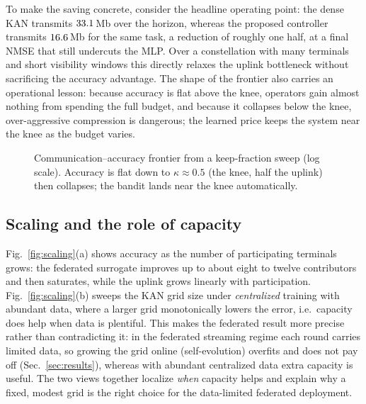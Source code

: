 \documentclass[journal]{IEEEtran}
\begin{document}
To make the saving concrete, consider the headline operating point: the dense KAN
transmits $33.1$\,Mb over the horizon, whereas the proposed controller transmits
$16.6$\,Mb for the same task, a reduction of roughly one half, at a final NMSE
that still undercuts the MLP. Over a constellation with many terminals and short
visibility windows this directly relaxes the uplink bottleneck without sacrificing
the accuracy advantage. The shape of the frontier also carries an operational
lesson: because accuracy is flat above the knee, operators gain almost nothing from
spending the full budget, and because it collapses below the knee, over-aggressive
compression is dangerous; the learned price keeps the system near the knee as the
budget varies.

\begin{figure}[t]
\centering
{}
\caption{Communication--accuracy frontier from a keep-fraction sweep (log scale).
Accuracy is flat down to $\kappa\!\approx\!0.5$ (the knee, half the uplink) then
collapses; the bandit lands near the knee automatically.}
\label{fig:pareto2}
\end{figure}

\subsection{Scaling and the role of capacity}
Fig.~\ref{fig:scaling}(a) shows accuracy as the number of participating terminals
grows: the federated surrogate improves up to about eight to twelve contributors
and then saturates, while the uplink grows linearly with participation.
Fig.~\ref{fig:scaling}(b) sweeps the KAN grid size under \emph{centralized}
training with abundant data, where a larger grid monotonically lowers the error,
i.e.\ capacity does help when data is plentiful. This makes the federated result
more precise rather than contradicting it: in the federated streaming regime each
round carries limited data, so growing the grid online (self-evolution) overfits
and does not pay off (Sec.~\ref{sec:results}), whereas with abundant centralized
data extra capacity is useful. The two views together localize \emph{when}
capacity helps and explain why a fixed, modest grid is the right choice for the
data-limited federated deployment.
\end{document}
